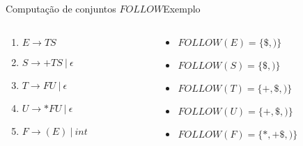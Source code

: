 \begin{frame}{Computação de conjuntos $FOLLOW$}{Exemplo}
    \begin{columns}
        \begin{column}{0.3\textwidth}
            \begin{enumerate}
              \item $E \rightarrow T S$

              \item $S \rightarrow + T S\ |\ \epsilon$

              \item $T \rightarrow F U\ |\ \epsilon$

              \item $U \rightarrow * F U\ |\ \epsilon$

              \item $F \rightarrow ( E )\ |\ int$
            \end{enumerate}
        \end{column}    
        \pause
        \begin{column}{0.7\textwidth}
            \begin{itemize}
                \item $FOLLOW(E) = \{\$, )\}$
                \item $FOLLOW(S) = \{\$, )\}$
                \item $FOLLOW(T) = \{+, \$, )\}$
                \item $FOLLOW(U) = \{+, \$, )\}$
                \item $FOLLOW(F) = \{*, + \$, )\}$
            \end{itemize}
        \end{column}    
    \end{columns}
\end{frame}
